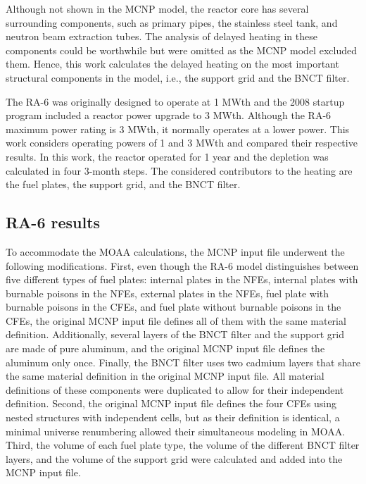 \documentclass{style/nseJournal}
\begin{document}
Although not shown in the MCNP model, the reactor core has several surrounding components, such as primary pipes, the stainless steel tank, and neutron beam extraction tubes.
The analysis of delayed heating in these components could be worthwhile but were omitted as the MCNP model excluded them.
Hence, this work calculates the delayed heating on the most important structural components in the model, i.e., the support grid and the BNCT filter.

The RA-6 was originally designed to operate at 1 MWth and the 2008 startup program included a reactor power upgrade to 3 MWth.
Although the RA-6 maximum power rating is 3 MWth, it normally operates at a lower power.
This work considers operating powers of 1 and 3 MWth and compared their respective results.
In this work, the reactor operated for 1 year and the depletion was calculated in four 3-month steps.
The considered contributors to the heating are the fuel plates, the support grid, and the BNCT filter.


\subsection{RA-6 results}

To accommodate the MOAA calculations, the MCNP input file underwent the following modifications.
First, even though the RA-6 model distinguishes between five different types of fuel plates: internal plates in the NFEs, internal plates with burnable poisons in the NFEs, external plates in the NFEs, fuel plate with burnable poisons in the CFEs, and fuel plate without burnable poisons in the CFEs, the original MCNP input file defines all of them with the same material definition.
Additionally, several layers of the BNCT filter and the support grid are made of pure aluminum, and the original MCNP input file defines the aluminum only once.
Finally, the BNCT filter uses two cadmium layers that share the same material definition in the original MCNP input file.
All material definitions of these components were duplicated to allow for their independent definition.
Second, the original MCNP input file defines the four CFEs using nested structures with independent cells, but as their definition is identical, a minimal universe renumbering allowed their simultaneous modeling in MOAA.
Third, the volume of each fuel plate type, the volume of the different BNCT filter layers, and the volume of the support grid were calculated and added into the MCNP input file.
\end{document}
